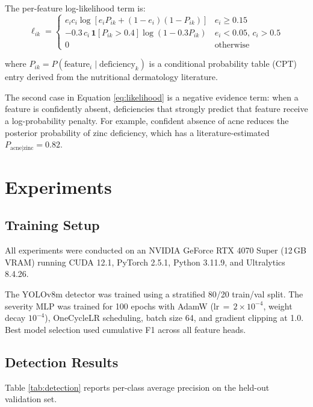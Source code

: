 \documentclass[journal]{IEEEtran}
\begin{document}
The per-feature log-likelihood term is:
\begin{equation}
\ell_{ik} = \begin{cases}
e_i c_i \log[e_i P_{ik} + (1-e_i)(1-P_{ik})] & e_i \geq 0.15\\
-0.3\,c_i\,\mathbf{1}[P_{ik}{>}0.4]\log(1\!-\!0.3P_{ik}) & e_i{<}0.05,\,c_i{>}0.5\\
0 & \text{otherwise}
\end{cases}
\label{eq:likelihood}
\end{equation}

where $P_{ik} = P(\text{feature}_i \mid \text{deficiency}_k)$ is a conditional
probability table (CPT) entry derived from the nutritional dermatology literature.

The second case in Equation \ref{eq:likelihood} is a negative evidence term:
when a feature is confidently absent, deficiencies that strongly predict that
feature receive a log-probability penalty. For example, confident absence of
acne reduces the posterior probability of zinc deficiency, which has a
literature-estimated $P_{\text{acne}|\text{zinc}} = 0.82$.

\section{Experiments}
\label{sec:experiments}

\subsection{Training Setup}

All experiments were conducted on an NVIDIA GeForce RTX 4070 Super (12\,GB VRAM)
running CUDA 12.1, PyTorch 2.5.1, Python 3.11.9, and Ultralytics 8.4.26.

The YOLOv8m detector was trained using a stratified 80/20 train/val split.
The severity MLP was trained for 100 epochs with AdamW (lr$\,=\,2 \times 10^{-4}$,
weight decay $10^{-4}$), OneCycleLR scheduling, batch size 64, and gradient
clipping at 1.0. Best model selection used cumulative F1 across all feature heads.

\subsection{Detection Results}

Table \ref{tab:detection} reports per-class average precision on the held-out
validation set.
\end{document}
